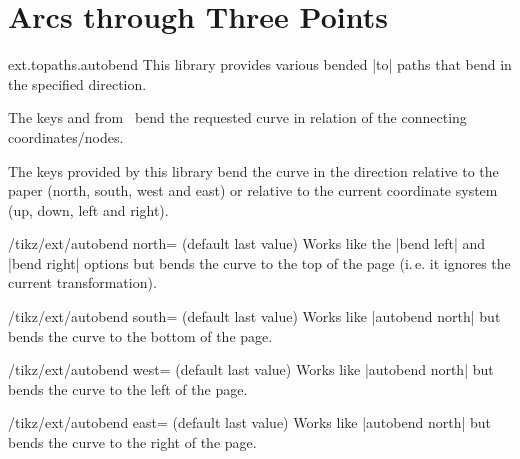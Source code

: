 %
%
%

\section{Arcs through Three Points}
\label{library:topaths.autobend}
\begin{tikzlibrary}{ext.topaths.autobend}
  This library provides various bended |to| paths
  that bend in the specified direction.
  
\end{tikzlibrary}

The keys 
and  from \tikzname\ 
bend the requested curve in relation of the connecting
coordinates/nodes.

The keys provided by this library bend the curve in the direction relative
to the paper (north, south, west and east) or relative to the current
coordinate system (up, down, left and right).

\begin{key}{/tikz/ext/autobend north= (default \normalfont last value)}
  Works like the |bend left| and |bend right| options
  but bends the curve to the top of the page (i.\,e. it ignores the current transformation).
\end{key}
\begin{key}{/tikz/ext/autobend south= (default \normalfont last value)}
  Works like |autobend north| but bends the curve to the bottom of the page.
\end{key}
\begin{key}{/tikz/ext/autobend west= (default \normalfont last value)}
  Works like |autobend north| but bends the curve to the left of the page.
\end{key}
\begin{key}{/tikz/ext/autobend east= (default \normalfont last value)}
  Works like |autobend north| but bends the curve to the right of the page.
\end{key}

